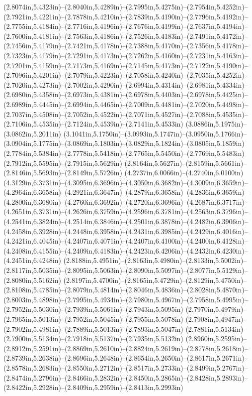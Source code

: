 (2.8074in,5.4323in)--(2.8040in,5.4289in)--(2.7995in,5.4275in)--(2.7954in,5.4252in)--(2.7921in,5.4221in)--(2.7878in,5.4210in)--(2.7839in,5.4190in)--(2.7796in,5.4192in)--(2.7755in,5.4184in)--(2.7716in,5.4196in)--(2.7676in,5.4199in)--(2.7637in,5.4194in)--(2.7600in,5.4181in)--(2.7563in,5.4186in)--(2.7526in,5.4183in)--(2.7491in,5.4172in)--(2.7456in,5.4179in)--(2.7421in,5.4178in)--(2.7388in,5.4170in)--(2.7356in,5.4178in)--(2.7323in,5.4179in)--(2.7291in,5.4173in)--(2.7262in,5.4160in)--(2.7231in,5.4163in)--(2.7201in,5.4159in)--(2.7173in,5.4169in)--(2.7145in,5.4173in)--(2.7122in,5.4190in)--(2.7096in,5.4201in)--(2.7079in,5.4223in)--(2.7058in,5.4240in)--(2.7035in,5.4252in)--(2.7020in,5.4273in)--(2.7002in,5.4290in)--(2.6994in,5.4314in)--(2.6981in,5.4334in)--(2.6980in,5.4358in)--(2.6973in,5.4381in)--(2.6978in,5.4403in)--(2.6978in,5.4425in)--(2.6989in,5.4445in)--(2.6994in,5.4465in)--(2.7009in,5.4481in)--(2.7020in,5.4498in)--(2.7037in,5.4508in)--(2.7052in,5.4522in)--(2.7071in,5.4527in)--(2.7088in,5.4535in)--(2.7106in,5.4535in)--(2.7124in,5.4539in)--(2.7141in,5.4533in) (3.0886in,5.1975in)--(3.0862in,5.2011in) (3.1041in,5.1750in)--(3.0993in,5.1747in)--(3.0950in,5.1766in)--(3.0904in,5.1775in)--(3.0869in,5.1803in)--(3.0829in,5.1824in)--(3.0805in,5.1859in) (2.7784in,5.5384in)--(2.7778in,5.5418in)--(2.7765in,5.5450in)--(2.7769in,5.5483in) (2.7912in,5.5595in)--(2.7915in,5.5629in) (2.8164in,5.5627in)--(2.8159in,5.5661in)--(2.8146in,5.5693in)--(2.8149in,5.5726in) (4.2737in,6.0066in)--(4.2740in,6.0100in) (4.3129in,6.3731in)--(4.3095in,6.3696in)--(4.3050in,6.3682in)--(4.3009in,6.3659in)--(4.2964in,6.3658in)--(4.2921in,6.3647in)--(4.2879in,6.3658in)--(4.2836in,6.3659in)--(4.2800in,6.3680in)--(4.2760in,6.3692in)--(4.2720in,6.3696in)--(4.2687in,6.3717in)--(4.2651in,6.3731in)--(4.2626in,6.3759in)--(4.2596in,6.3781in)--(4.2563in,6.3796in)--(4.2541in,6.3824in)--(4.2514in,6.3846in)--(4.2501in,6.3878in)--(4.2482in,6.3906in)--(4.2458in,6.3928in)--(4.2448in,6.3958in)--(4.2431in,6.3985in)--(4.2429in,6.4016in)--(4.2421in,6.4045in)--(4.2407in,6.4071in)--(4.2407in,6.4100in)--(4.2400in,6.4128in)--(4.2408in,6.4155in)--(4.2409in,6.4183in)--(4.2423in,6.4206in)--(4.2432in,6.4230in)--(4.2451in,6.4248in) (2.8188in,5.4951in)--(2.8163in,5.4980in)--(2.8133in,5.5002in)--(2.8117in,5.5035in)--(2.8095in,5.5063in)--(2.8090in,5.5097in)--(2.8077in,5.5129in)--(2.8080in,5.5162in) (2.8197in,5.4700in)--(2.8165in,5.4729in)--(2.8129in,5.4750in)--(2.8108in,5.4785in)--(2.8079in,5.4814in)--(2.8046in,5.4836in)--(2.8028in,5.4870in)--(2.8003in,5.4898in)--(2.7995in,5.4934in)--(2.7980in,5.4967in)--(2.7958in,5.4995in)--(2.7952in,5.5030in)--(2.7939in,5.5061in)--(2.7943in,5.5095in) (2.7970in,5.4979in)--(2.7965in,5.5013in)--(2.7952in,5.5045in)--(2.7955in,5.5078in) (2.7908in,5.4947in)--(2.7902in,5.4981in)--(2.7889in,5.5013in)--(2.7893in,5.5047in) (2.7881in,5.5134in)--(2.7900in,5.5134in)--(2.7918in,5.5137in)--(2.7935in,5.5132in) (2.8960in,5.2595in)--(2.8912in,5.2591in)--(2.8869in,5.2610in)--(2.8824in,5.2619in)--(2.8778in,5.2618in)--(2.8739in,5.2638in)--(2.8696in,5.2648in)--(2.8654in,5.2650in)--(2.8617in,5.2671in)--(2.8578in,5.2683in)--(2.8550in,5.2712in)--(2.8517in,5.2733in)--(2.8499in,5.2767in)--(2.8474in,5.2796in)--(2.8466in,5.2832in)--(2.8450in,5.2865in)--(2.8428in,5.2893in)--(2.8422in,5.2928in)--(2.8409in,5.2959in)--(2.8413in,5.2993in) 